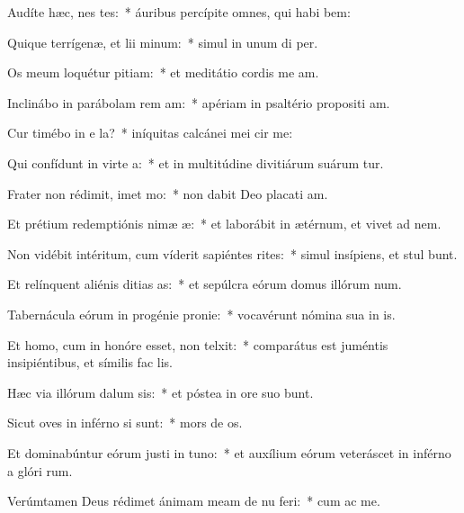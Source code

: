 \item Audíte hæc, nes tes:~* áuribus percípite omnes, qui habi bem:
\item Quique terrígenæ, et lii minum:~* simul in unum di  per.
\item Os meum loquétur pitiam:~* et meditátio cordis me am.
\item Inclinábo in parábolam rem am:~* apériam in psaltério propositi am.
\item Cur timébo in e la?~* iníquitas calcánei mei cir me:
\item Qui confídunt in virte a:~* et in multitúdine divitiárum suárum tur.
\item Frater non rédimit, imet mo:~* non dabit Deo placati am.
\item Et prétium redemptiónis nimæ æ:~* et laborábit in ætérnum, et vivet ad  nem.
\item Non vidébit intéritum, cum víderit sapiéntes rites:~* simul insípiens, et stul bunt.
\item Et relínquent aliénis ditias as:~* et sepúlcra eórum domus illórum  num.
\item Tabernácula eórum in progénie  pronie:~* vocavérunt nómina sua in  is.
\item Et homo, cum in honóre esset, non telxit:~* comparátus est juméntis insipiéntibus, et símilis fac  lis.
\item Hæc via illórum dalum sis:~* et póstea in ore suo bunt.
\item Sicut oves in inférno si sunt:~* mors de os.
\item Et dominabúntur eórum justi in tuno:~* et auxílium eórum veteráscet in inférno a glóri rum.
\item Verúmtamen Deus rédimet ánimam meam de nu feri:~* cum ac me.
